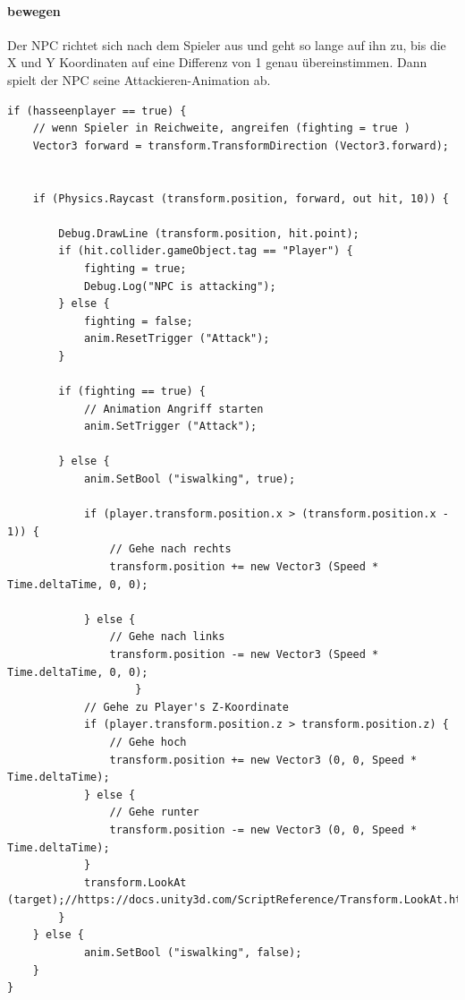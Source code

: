 \paragraph{bewegen }
Der NPC richtet sich nach dem Spieler aus und geht so lange auf ihn zu, bis die X und Y Koordinaten auf eine Differenz von 1 genau übereinstimmen.
Dann spielt der NPC seine Attackieren-Animation ab.
\begin{lstlisting}
if (hasseenplayer == true) {	
	// wenn Spieler in Reichweite, angreifen (fighting = true )
	Vector3 forward = transform.TransformDirection (Vector3.forward);

	
	if (Physics.Raycast (transform.position, forward, out hit, 10)) {	

		Debug.DrawLine (transform.position, hit.point);
		if (hit.collider.gameObject.tag == "Player") {
			fighting = true;
			Debug.Log("NPC is attacking");
		} else {
			fighting = false;
			anim.ResetTrigger ("Attack");
		}

		if (fighting == true) {
			// Animation Angriff starten
			anim.SetTrigger ("Attack");
			
		} else {	
			anim.SetBool ("iswalking", true);
					
			if (player.transform.position.x > (transform.position.x - 1)) {
				// Gehe nach rechts
				transform.position += new Vector3 (Speed * Time.deltaTime, 0, 0);
            		
			} else {
				// Gehe nach links
				transform.position -= new Vector3 (Speed * Time.deltaTime, 0, 0);
					}
			// Gehe zu Player's Z-Koordinate
			if (player.transform.position.z > transform.position.z) {
				// Gehe hoch
				transform.position += new Vector3 (0, 0, Speed * Time.deltaTime);
			} else {
				// Gehe runter
				transform.position -= new Vector3 (0, 0, Speed * Time.deltaTime);
			}
			transform.LookAt (target);//https://docs.unity3d.com/ScriptReference/Transform.LookAt.html
		}
	} else {
			anim.SetBool ("iswalking", false);
	}
}

\end{lstlisting}
